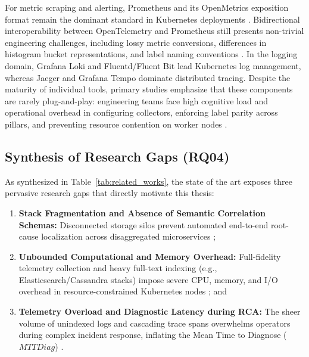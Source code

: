 For metric scraping and alerting, Prometheus and its OpenMetrics exposition format remain the dominant standard in Kubernetes deployments \cite{usman_2022, faseeha_2025}. Bidirectional interoperability between OpenTelemetry and Prometheus still presents non-trivial engineering challenges, including lossy metric conversions, differences in histogram bucket representations, and label naming conventions \cite{hartikainen_2024}. In the logging domain, Grafana Loki and Fluentd/Fluent Bit lead Kubernetes log management, whereas Jaeger and Grafana Tempo dominate distributed tracing. Despite the maturity of individual tools, primary studies emphasize that these components are rarely plug-and-play: engineering teams face high cognitive load and operational overhead in configuring collectors, enforcing label parity across pillars, and preventing resource contention on worker nodes \cite{kosinska_2023, usman_2022}.

\subsection{Synthesis of Research Gaps (RQ04)}



As synthesized in Table~\ref{tab:related_works}, the state of the art exposes three pervasive research gaps that directly motivate this thesis:
\begin{enumerate}
    \item \textbf{Stack Fragmentation and Absence of Semantic Correlation Schemas:} Disconnected storage silos prevent automated end-to-end root-cause localization across disaggregated microservices \cite{usman_2022, gomes_2025};
    \item \textbf{Unbounded Computational and Memory Overhead:} Full-fidelity telemetry collection and heavy full-text indexing (e.g., Elasticsearch/Cassandra stacks) impose severe CPU, memory, and I/O overhead in resource-constrained Kubernetes nodes \cite{zanatta_23, araujo_2024}; and
    \item \textbf{Telemetry Overload and Diagnostic Latency during RCA:} The sheer volume of unindexed logs and cascading trace spans overwhelms operators during complex incident response, inflating the Mean Time to Diagnose ($MTTDiag$) \cite{han_2024, deng_2024}.
\end{enumerate}
